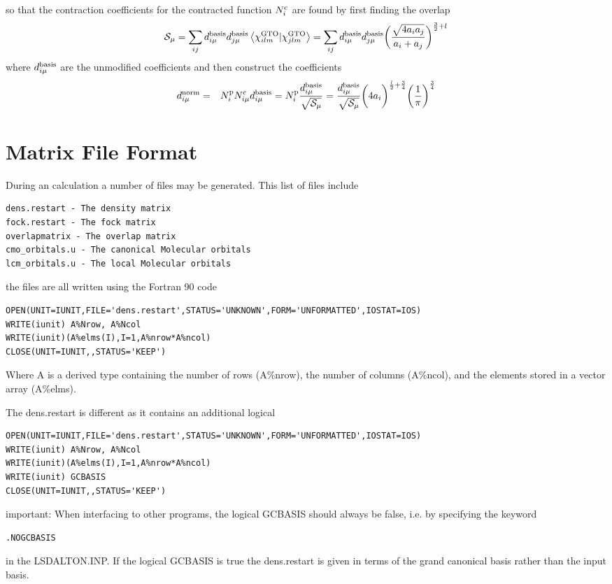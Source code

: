 so that the contraction coefficients for the contracted function $N^{\text{c}}_{i}$ are found by first finding the overlap
\begin{eqnarray}
\mathcal{S}_{\mu} = \sum_{ij} d_{i\mu}^{\text{basis}} d_{j\mu}^{\text{basis}} \left\langle \chi^{\text{GTO}}_{ilm} | \chi^{\text{GTO}}_{jlm} \right\rangle = \sum_{ij} d_{i\mu}^{\text{basis}} d_{j\mu}^{\text{basis}} \biggl( \frac{\sqrt{ 4 a_{i} a_{j}}}{a_{i}+a_{j}} \biggr)^{\frac{3}{2}+l}
\end{eqnarray}
where $d_{i\mu}^{\text{basis}}$ are the unmodified coefficients and then construct the coefficients
\begin{eqnarray}
d_{i\mu}^{\text{norm}} &=& N^{\text{p}}_{i}N^{\text{c}}_{i\mu}d^{\text{basis}}_{i\mu} = N^{\text{p}}_{i}\frac{d^{\text{basis}}_{i\mu}}{\sqrt{ \mathcal{S}_{\mu} }} = \frac{d_{i\mu}^{\text{basis}}}{\sqrt{\mathcal{S}_{\mu}}} \biggl( 4 a_{i}\biggr)^{\frac{l}{2} + \frac{3}{4}} \biggl( \frac{1}{\pi} \biggr)^{\frac{3}{4}}\end{eqnarray}

\section{Matrix File Format}

During an {\lsdalton} calculation a number of files may be generated. This list of files include 

\begin{verbatim}
dens.restart - The density matrix
fock.restart - The fock matrix
overlapmatrix - The overlap matrix
cmo_orbitals.u - The canonical Molecular orbitals 
lcm_orbitals.u - The local Molecular orbitals 
\end{verbatim}

the files are all written using the Fortran 90 code

\begin{lstlisting}
OPEN(UNIT=IUNIT,FILE='dens.restart',STATUS='UNKNOWN',FORM='UNFORMATTED',IOSTAT=IOS)
WRITE(iunit) A%Nrow, A%Ncol
WRITE(iunit)(A%elms(I),I=1,A%nrow*A%ncol)
CLOSE(UNIT=IUNIT,,STATUS='KEEP')
\end{lstlisting}

Where A is a derived type containing the number of rows (A$\%$nrow), the number of columns (A$\%$ncol), and the elements stored in a vector array (A$\%$elms). 

The dens.restart is different as it contains an additional logical 
\begin{lstlisting}
OPEN(UNIT=IUNIT,FILE='dens.restart',STATUS='UNKNOWN',FORM='UNFORMATTED',IOSTAT=IOS)
WRITE(iunit) A%Nrow, A%Ncol
WRITE(iunit)(A%elms(I),I=1,A%nrow*A%ncol)
WRITE(iunit) GCBASIS
CLOSE(UNIT=IUNIT,,STATUS='KEEP')
\end{lstlisting}
{\sc important:} When interfacing to other programs, the logical GCBASIS should always be false, 
i.e. by specifying the keyword
\begin{verbatim}
.NOGCBASIS
\end{verbatim}
in the LSDALTON.INP.
If the logical GCBASIS is true 
the dens.restart is given in terms of the grand canonical basis rather than the input basis.


